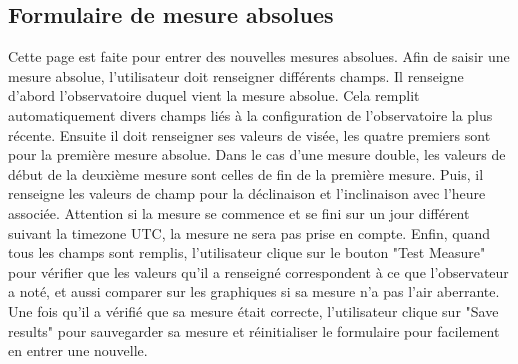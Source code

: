 \documentclass[10pt,a4paper]{report}
\begin{document}
\subsection{Formulaire de mesure absolues}
\label{sec:abs}
Cette page est faite pour entrer des nouvelles mesures absolues.
\linebreak
Afin de saisir une mesure absolue, l'utilisateur doit renseigner différents champs.
Il renseigne d'abord l'observatoire duquel vient la mesure absolue. Cela remplit automatiquement divers champs liés à la configuration de l'observatoire la plus récente.
\linebreak
Ensuite il doit renseigner ses valeurs de visée, les quatre premiers sont pour la première mesure absolue. Dans le cas d'une mesure double, les valeurs de début de la deuxième mesure sont celles de fin de la première mesure.
\linebreak
Puis, il renseigne les valeurs de champ pour la déclinaison et l'inclinaison avec l'heure associée. Attention si la mesure se commence et se fini sur un jour différent suivant la timezone UTC, la mesure ne sera pas prise en compte.
\linebreak
Enfin, quand tous les champs sont remplis, l'utilisateur clique sur le bouton "Test Measure" pour vérifier que les valeurs qu'il a renseigné correspondent à ce que l'observateur a noté, et aussi comparer sur les graphiques si sa mesure n'a pas l'air aberrante.
\linebreak
Une fois qu'il a vérifié que sa mesure était correcte, l'utilisateur clique sur "Save results" pour sauvegarder sa mesure et réinitialiser le formulaire pour facilement en entrer une nouvelle.
\end{document}
